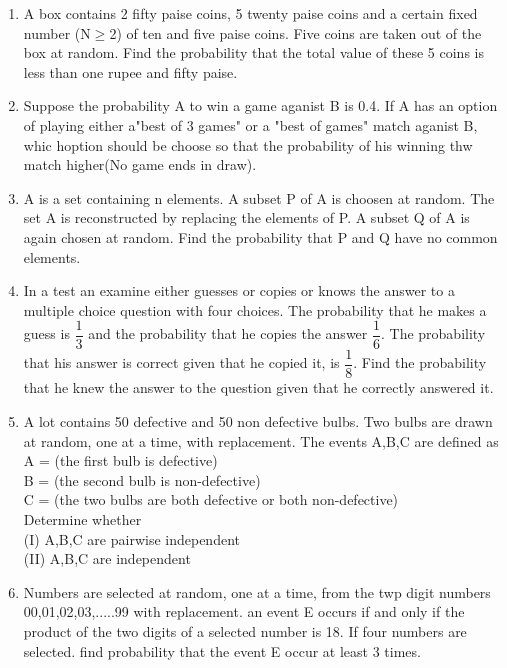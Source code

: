 \documentclass[journal,12pt,twocolumn]{IEEEtran}
\begin{document}
\begin{enumerate}[label=\arabic*]
	 \item A box contains 2 fifty paise coins, 5 twenty paise coins and a certain fixed number (N$\geq$2) of ten and five paise coins. Five coins are taken out of the box at random. Find the probability that the total value of these 5 coins is less than one rupee and fifty paise.\\
	 \item Suppose the probability A to win a game aganist B is 0.4. If A has an option of playing either a"best of 3 games" or a "best of  games" match aganist B, whic hoption should be choose so that the probability of his winning thw match higher(No game ends in draw).\\
	 \item A is a set containing n elements. A subset P of A is choosen at random. The set A is reconstructed by replacing the elements of P. A subset Q of A is again chosen at random. Find the probability that P and Q have no common elements.\\
	 \item In a test an examine either guesses or copies or knows the answer to a multiple choice question with four choices. The probability that he makes a guess is $\dfrac{1}{3}$ and the probability that he copies the answer $\dfrac{1}{6}$. The probability that his answer is correct given that he copied it, is $\dfrac{1}{8}$. Find the probability that he knew the answer to the question given that he correctly answered it.\\
	 \item A lot contains 50 defective and 50 non defective bulbs. Two bulbs are drawn at random, one at a time, with replacement. The events A,B,C are defined as\\
	 A = (the first bulb is defective)\\
	 B = (the second bulb is non-defective)\\
	 C = (the two bulbs are both defective or both non-defective)\\
	 Determine whether\\
	 (I) A,B,C are pairwise independent\\
	 (II) A,B,C are independent\\
	 \item Numbers are selected at random, one at a time, from the twp digit numbers 00,01,02,03,.....99 with replacement. an event E occurs if and only if the product of the two digits of a selected number is 18. If four numbers are selected. find probability that the event E occur at least 3 times.\\

\end{enumerate}
\end{document}
